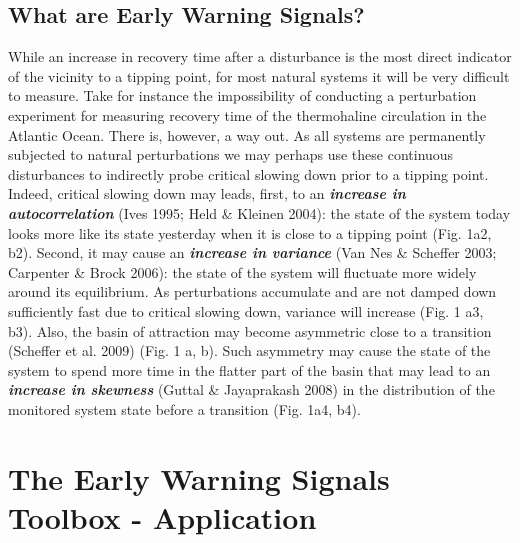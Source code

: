 \documentclass[12pt,a4paper,final]{article}
\begin{document}
\subsection{What are Early Warning Signals?}
While an increase in recovery time after a disturbance is the most direct indicator of the vicinity to a tipping point, for most natural systems it will be very difficult to measure. Take for instance the impossibility of conducting a perturbation experiment for measuring recovery time of the thermohaline circulation in the Atlantic Ocean. There is, however, a way out. As all systems are permanently subjected to natural perturbations we may perhaps use these continuous disturbances to indirectly probe critical slowing down prior to a tipping point. Indeed, critical slowing down may leads, first, to an \textit{\textbf{increase in autocorrelation}} (Ives 1995; Held \& Kleinen 2004): the state of the system today looks more like its state yesterday when it is close to a tipping point (Fig. 1a2, b2). %
Second, it may cause an \textit{\textbf{increase in variance}} (Van Nes \& Scheffer 2003; Carpenter \& Brock 2006): the state of the system will fluctuate more widely around its equilibrium. As perturbations accumulate and are not damped down sufficiently fast due to critical slowing down, variance will increase (Fig. 1 a3, b3). Also, the basin of attraction may become asymmetric close to a transition (Scheffer et al. 2009) (Fig. 1 a, b). Such asymmetry may cause the state of the system to spend more time in the flatter part of the basin that may lead to an \textit{\textbf{increase in skewness}} (Guttal \& Jayaprakash 2008) in the distribution of the monitored system state before a transition (Fig. 1a4, b4).

\section{The Early Warning Signals Toolbox - Application}
\end{document}
